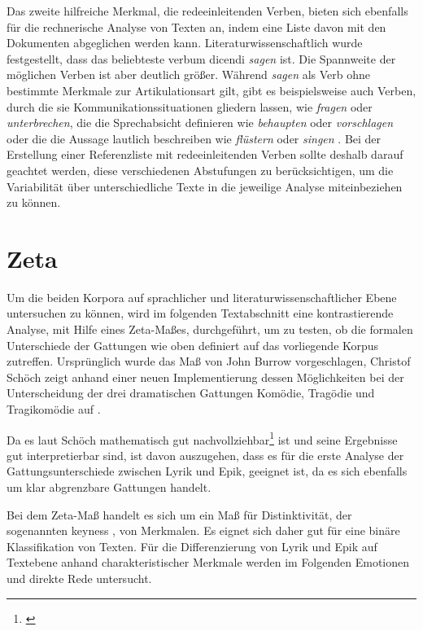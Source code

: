 \documentclass[a4paper,10p]{article}
\begin{document}
Das zweite hilfreiche Merkmal, die redeeinleitenden Verben, bieten sich ebenfalls für die rechnerische Analyse von Texten an, indem eine Liste davon mit den Dokumenten abgeglichen werden kann. Literaturwissenschaftlich wurde festgestellt, dass das beliebteste verbum dicendi \textit{sagen} ist. Die Spannweite der möglichen Verben ist aber deutlich größer. Während \textit{sagen} als Verb ohne bestimmte Merkmale zur Artikulationsart gilt, gibt es beispielsweise auch Verben, durch die sie Kommunikationssituationen gliedern lassen, wie \textit{fragen} oder \textit{unterbrechen}, die die Sprechabsicht definieren wie \textit{behaupten} oder \textit{vorschlagen} oder die die Aussage lautlich beschreiben wie \textit{flüstern} oder \textit{singen} \citep[vgl.][S. 66-68]{Bloß2005}. Bei der Erstellung einer Referenzliste mit redeeinleitenden Verben sollte deshalb darauf geachtet werden, diese verschiedenen Abstufungen zu berücksichtigen, um die Variabilität über unterschiedliche Texte in die jeweilige Analyse miteinbeziehen zu können.


\section{Zeta}
Um die beiden Korpora auf sprachlicher und literaturwissenschaftlicher Ebene untersuchen zu können, wird im folgenden Textabschnitt eine kontrastierende Analyse, mit Hilfe eines Zeta-Maßes, durchgeführt, um zu testen, ob die formalen Unterschiede der Gattungen wie oben definiert auf das vorliegende Korpus zutreffen. Ursprünglich wurde das Maß von John Burrow vorgeschlagen, Christof Schöch zeigt anhand einer neuen Implementierung dessen Möglichkeiten bei der Unterscheidung der drei dramatischen Gattungen Komödie, Tragödie und Tragikomödie auf \citep[vgl.][S. 77 f.]{SchöchZeta}. \par 

Da es laut  Schöch \glqq mathematisch gut nachvollziehbar\grqq \footnote{\citep[S. 78]{SchöchZeta}} ist und seine Ergebnisse gut interpretierbar sind, ist davon auszugehen, dass es für die erste Analyse der Gattungsunterschiede zwischen Lyrik und Epik, geeignet ist, da es sich ebenfalls um klar abgrenzbare Gattungen handelt.\par 

Bei dem Zeta-Maß handelt es sich um ein Maß für Distinktivität, der sogenannten \glq keyness \grq, von Merkmalen. Es eignet sich daher gut für eine binäre Klassifikation von Texten. Für die Differenzierung von Lyrik und Epik auf Textebene anhand charakteristischer Merkmale werden im Folgenden Emotionen und direkte Rede untersucht. \par 
\end{document}
